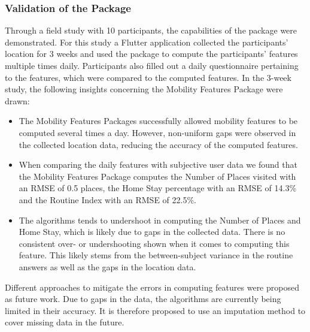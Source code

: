 \subsubsection*{Validation of the Package}
Through a field study with 10 participants, the capabilities of the package were demonstrated. For this study a Flutter application collected the participants' location for 3 weeks and used the package to compute the participants' features multiple times daily. Participants also filled out a daily questionnaire pertaining to the features, which were compared to the computed features. In the 3-week study, the following insights concerning the Mobility Features Package were drawn:

\begin{itemize}
    \item The Mobility Features Packages successfully allowed mobility features to be computed several times a day. However, non-uniform gaps were observed in the collected location data, reducing the accuracy of the computed features. 
    
    \item When comparing the daily features with subjective user data we found that the Mobility Features Package computes the Number of Places visited with an RMSE of 0.5 places, the Home Stay percentage with an RMSE of 14.3\% and the Routine Index with an RMSE of 22.5\%.
    
    \item The algorithms tends to undershoot in computing the Number of Places and Home Stay, which is likely due to gaps in the collected data. There is no consistent over- or undershooting shown when it comes to computing this feature. This likely stems from the between-subject variance in the routine answers as well as the gaps in the location data.
\end{itemize}

Different approaches to mitigate the errors in computing features were proposed as future work. Due to gaps in the data, the algorithms are currently being limited in their accuracy. It is therefore proposed to use an imputation method to cover missing data in the future.